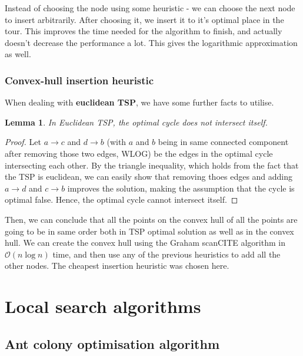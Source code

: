 \documentclass[12pt,twoside,notitlepage]{report}
\newtheorem{lemma}{Lemma}
\begin{document}
Instead of choosing the node using some heuristic - we can choose the next node to insert arbitrarily. After choosing it, we insert it to it's optimal place in the tour. This improves the time needed for the algorithm to finish, and actually doesn't decrease the performance a lot. This gives the logarithmic approximation as well.

\subsubsection{Convex-hull insertion heuristic}

When dealing with {\bf euclidean TSP}, we have some further facts to utilise. 

\begin{lemma}

In Euclidean TSP, the optimal cycle does not intersect itself.

\end{lemma}

\begin{proof}

Let $a \rightarrow c$ and $d \rightarrow b$ (with $a$ and $b$ being in same connected component after removing those two edges, WLOG) be the edges in the optimal cycle intersecting each other. By the triangle inequality, which holds from the fact that the TSP is euclidean, we can easily show that removing thoes edges and adding $a \rightarrow d$ and $c \rightarrow b$ improves the solution, making the assumption that the cycle is optimal false. Hence, the optimal cycle cannot intersect itself. 

\end{proof}

Then, we can conclude that all the points on the convex hull of all the points are going to be in same order both in TSP optimal solution as well as in the convex hull. We can create the convex hull using the Graham scanCITE algorithm in $ \mathcal{O}(n \log n) $ time, and then use any of the previous heuristics to add all the other nodes. The cheapest insertion heuristic was chosen here.

\section{Local search algorithms}

\subsection{Ant colony optimisation algorithm}
\end{document}
